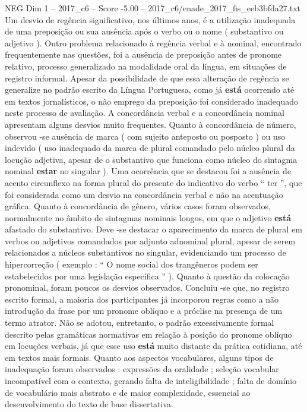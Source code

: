 \begin{textsample}{NEG Dim 1 – 2017\_c6 – Score -5.00 – 2017\_c6/enade\_2017\_fis\_eeb3bfda27.txt}
Um desvio de regência significativo, nos últimos anos, é a utilização inadequada de uma preposição ou sua ausência após o verbo ou o nome ( substantivo ou adjetivo ).
Outro problema relacionado à regência verbal e à nominal, encontrado frequentemente nas questões, foi a ausência de preposição antes de pronome relativo, processo generalizado na modalidade oral da língua, em situações de registro informal.
Apesar da possibilidade de que essa alteração de regência se generalize no padrão escrito da Língua Portuguesa, como já \textbf{está} ocorrendo até em textos jornalísticos, o não emprego da preposição foi considerado inadequado neste processo de avaliação.
A concordância verbal e a concordância nominal apresentam alguns desvios muito frequentes.
Quanto à concordância de número, observou -se ausência de marca ( com sujeito anteposto ou posposto ) ou uso indevido ( uso inadequado da marca de plural comandado pelo núcleo plural da locução adjetiva, apesar de o substantivo que funciona como núcleo do sintagma nominal \textbf{estar} no singular ).
Uma ocorrência que se destacou foi a ausência de acento circunflexo na forma plural do presente do indicativo do verbo “ ter ”, que foi considerada como um desvio na concordância verbal e não na acentuação gráfica.
Quanto à concordância de gênero, vários casos foram observados, normalmente no âmbito de sintagmas nominais longos, em que o adjetivo \textbf{está} afastado do substantivo.
Deve -se destacar o aparecimento da marca de plural em verbos ou adjetivos comandados por adjunto adnominal plural, apesar de serem relacionados a núcleos substantivos no singular, evidenciando um processo de hipercorreção ( exemplo : “ O nome social dos trangêneros podem ser estabelecidos por uma legislação específica ” ).
Quanto à questão da colocação pronominal, foram poucos os desvios observados.
Concluiu -se que, no registro escrito formal, a maioria dos participantes já incorporou regras como a não introdução da frase por um pronome oblíquo e a próclise na presença de um termo atrator.
Não se adotou, entretanto, o padrão excessivamente formal descrito pelas gramáticas normativas em relação à posição do pronome oblíquo em locuções verbais, já que esse uso \textbf{está} muito distante da prática cotidiana, até em textos mais formais.
Quanto aos aspectos vocabulares, alguns tipos de inadequação foram observados : expressões da oralidade ; seleção vocabular incompatível com o contexto, gerando falta de inteligibilidade ; falta de domínio de vocabulário mais abstrato e de maior complexidade, essencial ao desenvolvimento do texto de base dissertativa.

\end{textsample}
